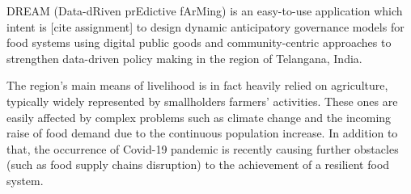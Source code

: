 

DREAM (Data-dRiven prEdictive fArMing) is an easy-to-use application which intent is [cite assignment] to design dynamic anticipatory governance models for food systems using digital public goods and community-centric approaches to strengthen data-driven policy making in the region of Telangana, India.

The region's main means of livelihood is in fact heavily relied on agriculture, typically widely represented by smallholders farmers' activities. These ones are easily affected by complex problems such as climate change and the incoming raise of food demand due to the continuous population increase. In addition to that, the occurrence of Covid-19 pandemic is recently causing further obstacles (such as food supply chains disruption) to the achievement of a resilient food system.


